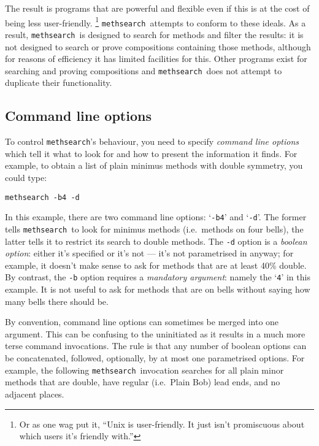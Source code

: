 \documentclass[a4paper,11pt,oneside]{book}
\makeatletter
\newcommand{\oi}[1]{\index{#1@{\hspace*{-\optwidth}\texttt{-}\texttt{#1}}}}
\newcommand{\symidx}[2]{} %
\def\methsearch{\texttt{meth\-search}}
\makeatother
\begin{document}
The result is programs that are powerful and flexible even if this is 
at the cost of being less user-friendly.%
\footnote{Or as one wag put it, ``Unix is user-friendly. 
It just isn't promiscuous about which users it's friendly with.''}
\methsearch\ attempts to conform to these ideals.  As a result,
\methsearch\ is designed to search for methods and filter the results:
it is not designed to search or prove compositions containing those methods,
although for reasons of efficiency it has limited facilities for this.
Other programs exist for searching and proving compositions and
\methsearch\ does not attempt to duplicate their functionality.

\subsection{Command line options}

To control \methsearch's behaviour, you need to specify 
\textit{command line options}%
\symidx{-}{options}  which tell it what to look for and how to 
present the information it finds.  For example, to obtain a list of plain
minimus methods with double symmetry, you could type:%

\begin{Verbatim}
methsearch -b4 -d
\end{Verbatim}

In this example, there are two command line options: `\verb+-b4+' and 
`\verb+-d+'.  The former\oi{b} tells \methsearch\ to look for minimus methods
(i.e.\ methods on four bells), the latter tells it to restrict its search
to double methods.\oi{d}  The \verb+-d+ option is a 
\textit{boolean option}: 
either it's specified or it's not --- it's not parametrised in anyway; 
for example, 
it doesn't make sense to ask for methods that are at least 40\% double.
By contrast, the \verb+-b+ option requires a 
\textit{mandatory argument}: 
namely the `\verb+4+' in this example.  It is not useful
to ask for methods that are on bells without saying how many bells there 
should be.

By convention, command line options can sometimes be merged into one 
argument.  This can be confusing to the uninitiated as it results in a much 
more terse command invocations.
The rule is that any number of boolean options can be concatenated,
followed, optionally, by at most one parametrised options.  For example,
the following \methsearch\ invocation searches for all plain minor methods
that are double, have regular (i.e.\ Plain Bob) lead ends, 
and no adjacent places.
\end{document}
